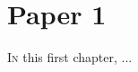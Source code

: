 \chapter{Paper 1}

\vspace*{-2.2em}
\minitoc
\vspace*{0.8em}

\lettrine[lines=3]{I}{n} this first chapter, ...




